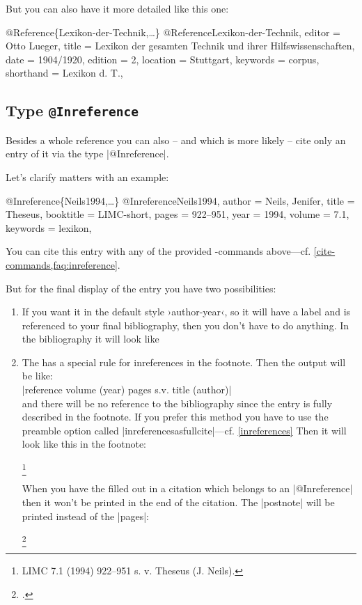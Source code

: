\documentclass[a4paper,
10pt,
greek,
french,
spanish,
italian,
ngerman,
english,
]{ltxdoc}
\begin{document}
But you can also have it  more detailed  like this one:
\begin{bibexample}[label=Lexikon-der-Technik]{{@}Reference\{Lexikon-der-Technik,…\}}
@Reference{Lexikon-der-Technik,
  editor    = {Otto Lueger},
  title     = {Lexikon der gesamten Technik und ihrer Hilfswissenschaften},
  date      = {1904/1920},
  edition   = {2},
  location  = Stuttgart,   %
  keywords  = {corpus},
  shorthand = {Lexikon d. T.},
}
\end{bibexample}

 \subsection{Type \texttt{@Inreference}}\label{inreference}
Besides a whole reference you can also -- and which is more likely -- cite only an entry of it via the type  |@Inreference|.

Let’s clarify matters with an example:
\begin{bibexample}[label=Neils1994]{{@}Inreference\{Neils1994,…\}}
@Inreference{Neils1994,
  author    = {Neils, Jenifer},
  title     = {Theseus},
  booktitle = LIMC-short,    %
  pages     = {922--951},
  year      = {1994},
  volume    = {7.1},
  keywords  = {lexikon},
}
\end{bibexample}
You can cite this entry with any of the provided -commands above---cf. \cref{cite-commands,faq:inreference}.

But for the final display of the entry  you have two possibilities:
 \begin{enumerate}
\item\label{inreference:a} 

If you want it in the default style ›author-year‹, so it will have a label and is referenced 
to your final bibliography, then you don’t have to do anything.
In the bibliography it will look like

\item\label{inreference:b} 
The \DAI has a special rule for inreferences in the footnote.
Then the output will be like:\\
|reference volume (year) pages s.v. title (author)| \\
and there will be no reference to the bibliography since the entry is fully described in the footnote.
 If you prefer this method you have to use the preamble option called  |inreferencesasfullcite|---cf. \cref{inreferences}
Then it will look like this in the footnote:
\begin{examplemanual}
\footnote{LIMC 7.1 (1994) 922--951 s. v. Theseus (J. Neils).}
\end{examplemanual}
When you have the  filled out in a citation which belongs to an |@Inreference| then it won’t be printed in the end of the citation.
The |postnote|  will be printed instead of the |pages|:
\begin{example}
\footnote{\cite[vgl.][930 Nr. 283]{Neils1994}.}
\end{example} 
\end{enumerate}
\end{document}
